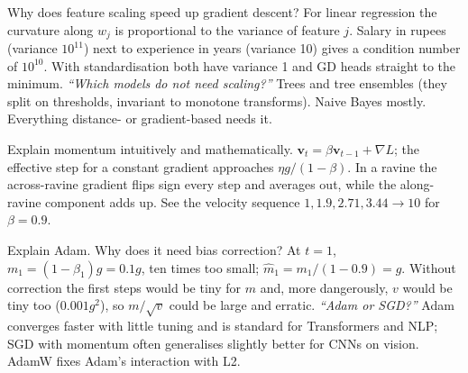 \begin{qa}{Why does feature scaling speed up gradient descent?}
\why For linear regression the curvature along $w_j$ is proportional to the variance of feature $j$. Salary in rupees
(variance $10^{11}$) next to experience in years (variance 10) gives a condition number of $10^{10}$. With standardisation
both have variance 1 and GD heads straight to the minimum.
\pushes \emph{``Which models do not need scaling?''} Trees and tree ensembles (they split on thresholds, invariant to
monotone transforms). Naive Bayes mostly. Everything distance- or gradient-based needs it.
\end{qa}

\begin{qa}{Explain momentum intuitively and mathematically.}
\why $\mathbf v_t = \beta\mathbf v_{t-1} + \nabla L$; the effective step for a constant gradient approaches $\eta g/(1-\beta)$.
In a ravine the across-ravine gradient flips sign every step and averages out, while the along-ravine component adds up.
\worked See the velocity sequence $1, 1.9, 2.71, 3.44 \to 10$ for $\beta=0.9$.
\end{qa}

\begin{qa}{Explain Adam. Why does it need bias correction?}
\why At $t=1$, $m_1 = (1-\beta_1)g = 0.1g$, ten times too small; $\hat m_1 = m_1/(1-0.9) = g$. Without correction the first
steps would be tiny for $m$ and, more dangerously, $v$ would be tiny too ($0.001g^2$), so $m/\sqrt v$ could be large and erratic.
\pushes \emph{``Adam or SGD?''} Adam converges faster with little tuning and is standard for Transformers and NLP; SGD with
momentum often generalises slightly better for CNNs on vision. AdamW fixes Adam's interaction with L2.
\end{qa}

